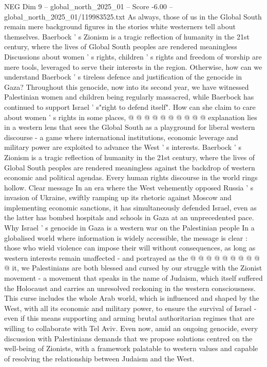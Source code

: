 \begin{textsample}{NEG Dim 9 – global\_north\_2025\_01 – Score -6.00 – global\_north\_2025\_01/119983525.txt}
As always, those of us in the Global South remain mere background figures in the stories white westerners tell about themselves.
Baerbock ' s Zionism is a tragic reflection of humanity in the 21st century, where the lives of Global South peoples are rendered meaningless Discussions about women ' s rights, children ' s rights and freedom of worship are mere tools, leveraged to serve their interests in the region.
Otherwise, how can we understand Baerbock ' s tireless defence and justification of the genocide in Gaza?
Throughout this genocide, now into its second year, we have witnessed Palestinian women and children being regularly massacred, while Baerbock has continued to support Israel ' s"right to defend itself".
How can she claim to care about women ' s rights in some places, @ @ @ @ @ @ @ @ @ @ explanation lies in a western lens that sees the Global South as a playground for liberal western discourse - a game where international institutions, economic leverage and military power are exploited to advance the West ' s interests.
Baerbock ' s Zionism is a tragic reflection of humanity in the 21st century, where the lives of Global South peoples are rendered meaningless against the backdrop of western economic and political agendas.
Every human rights discourse in the world rings hollow.
Clear message In an era where the West vehemently opposed Russia ' s invasion of Ukraine, swiftly ramping up its rhetoric against Moscow and implementing economic sanctions, it has simultaneously defended Israel, even as the latter has bombed hospitals and schools in Gaza at an unprecedented pace.
Why Israel ' s genocide in Gaza is a western war on the Palestinian people In a globalised world where information is widely accessible, the message is clear : those who wield violence can impose their will without consequences, as long as western interests remain unaffected - and portrayed as the @ @ @ @ @ @ @ @ @ @ it, we Palestinians are both blessed and cursed by our struggle with the Zionist movement - a movement that speaks in the name of Judaism, which itself suffered the Holocaust and carries an unresolved reckoning in the western consciousness.
This curse includes the whole Arab world, which is influenced and shaped by the West, with all its economic and military power, to ensure the survival of Israel - even if this means supporting and arming brutal authoritarian regimes that are willing to collaborate with Tel Aviv.
Even now, amid an ongoing genocide, every discussion with Palestinians demands that we propose solutions centred on the well-being of Zionists, with a framework palatable to western values and capable of resolving the relationship between Judaism and the West.

\end{textsample}
